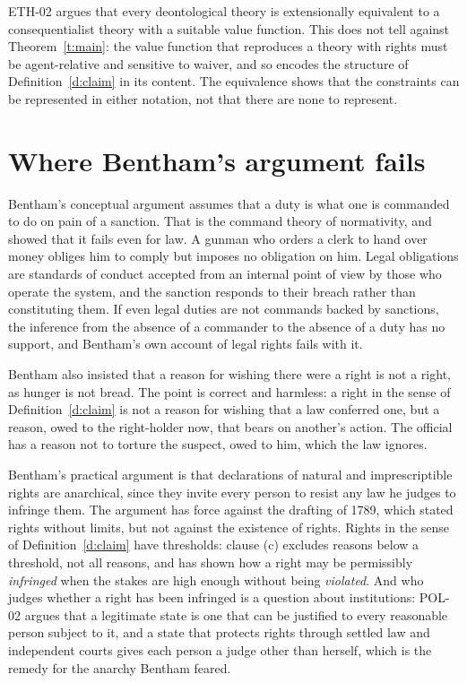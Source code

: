 \documentclass{situationist-preprint}
\begin{document}
\begin{remark}\label{r:eth02}
ETH-02 argues that every deontological theory is extensionally equivalent to a consequentialist theory with a suitable value function. This does not tell against Theorem~\ref{t:main}: the value function that reproduces a theory with rights must be agent-relative and sensitive to waiver, and so encodes the structure of Definition~\ref{d:claim} in its content. The equivalence shows that the constraints can be represented in either notation, not that there are none to represent.
\end{remark}

\section{Where Bentham's argument fails}

Bentham's conceptual argument assumes that a duty is what one is commanded to do on pain of a sanction. That is the command theory of normativity, and \citet[chs.~2--4]{Hart1961} showed that it fails even for law. A gunman who orders a clerk to hand over money obliges him to comply but imposes no obligation on him. Legal obligations are standards of conduct accepted from an internal point of view by those who operate the system, and the sanction responds to their breach rather than constituting them. If even legal duties are not commands backed by sanctions, the inference from the absence of a commander to the absence of a duty has no support, and Bentham's own account of legal rights fails with it.

Bentham also insisted that a reason for wishing there were a right is not a right, as hunger is not bread. The point is correct and harmless: a right in the sense of Definition~\ref{d:claim} is not a reason for wishing that a law conferred one, but a reason, owed to the right-holder now, that bears on another's action. The official has a reason not to torture the suspect, owed to him, which the law ignores.

Bentham's practical argument is that declarations of natural and imprescriptible rights are anarchical, since they invite every person to resist any law he judges to infringe them. The argument has force against the drafting of 1789, which stated rights without limits, but not against the existence of rights. Rights in the sense of Definition~\ref{d:claim} have thresholds: clause (c) excludes reasons below a threshold, not all reasons, and \citet[ch.~3]{Thomson1990} has shown how a right may be permissibly \emph{infringed} when the stakes are high enough without being \emph{violated}. And who judges whether a right has been infringed is a question about institutions: POL-02 argues that a legitimate state is one that can be justified to every reasonable person subject to it, and a state that protects rights through settled law and independent courts gives each person a judge other than herself, which is the remedy for the anarchy Bentham feared.
\end{document}
